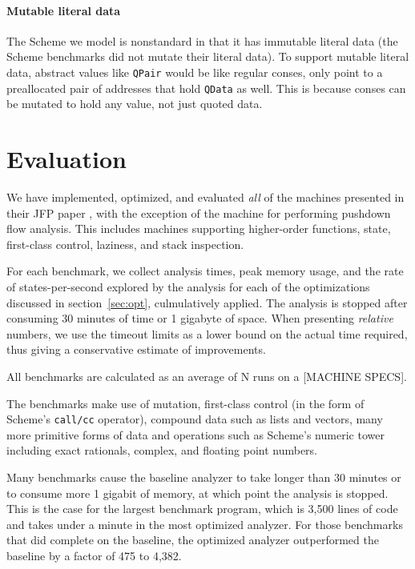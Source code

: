 \documentclass[preprint,onecolumn,9pt]{sigplanconf} %
\begin{document}
\paragraph{Mutable literal data} The Scheme we model is nonstandard in that it has immutable literal
data (the Scheme benchmarks did not mutate their literal data). To
support mutable literal data, abstract values like {\tt QPair} would
be like regular conses, only point to a preallocated pair of addresses
that hold {\tt QData} as well. This is because conses can be mutated
to hold any value, not just quoted data.

\section{Evaluation}
\label{sec:eval}

We have implemented, optimized, and evaluated \emph{all} of the
machines presented in their JFP paper
\cite{dvanhorn:VanHorn2012Systematic}, with the exception of the
machine for performing pushdown flow analysis.  This includes machines
supporting higher-order functions, state, first-class control,
laziness, and stack inspection.

For each benchmark, we collect analysis times, peak memory usage, and
the rate of states-per-second explored by the analysis for each of the
optimizations discussed in section~\ref{sec:opt}, culmulatively
applied.  The analysis is stopped after consuming 30 minutes of time
or 1 gigabyte of space.  When presenting \emph{relative} numbers, we
use the timeout limits as a lower bound on the actual time required,
thus giving a conservative estimate of improvements.

All benchmarks are calculated as an average of N runs on a [MACHINE
  SPECS].

The benchmarks make use of mutation, first-class control (in the form
of Scheme's {\tt call/cc} operator), compound data such as lists and
vectors, many more primitive forms of data and operations such as
Scheme's numeric tower including exact rationals, complex, and
floating point numbers.

Many benchmarks cause the baseline analyzer to take longer than 30
minutes or to consume more 1 gigabit of memory, at which point the
analysis is stopped.  This is the case for the largest benchmark
program, which is 3,500 lines of code and takes under a minute in the
most optimized analyzer.  For those benchmarks that did complete on
the baseline, the optimized analyzer outperformed the baseline by a
factor of 475 to 4,382.
\end{document}
